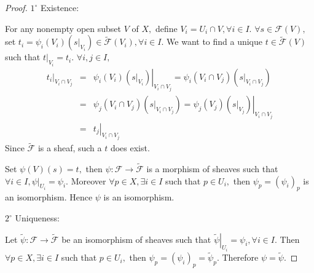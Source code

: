 \begin{proof}
$\mathit{1^{\circ}}$ Existence:

For any nonempty open subset $V$ of $X,$ define $V_i=U_i\cap V,
\forall i\in I.$ $\forall s\in\mathscr{F}(V),$ set
$t_i=\psi_i(V_i)(\left.s\right|_{V_i})\in\widetilde{\mathscr{F}}(V_i),
\forall i\in I.$ We want to find a unique
$t\in\widetilde{\mathscr{F}}(V)$ such that
$\left.t\right|_{V_i}=t_i.$ $\forall i,j\in I,$
\begin{eqnarray*}
\left.t_i\right|_{V_i\cap V_j} & = &
\left.\psi_i(V_i)(\left.s\right|_{V_i})\right|_{V_i\cap
V_j}=\psi_i(V_i\cap V_j)(\left.s\right|_{V_i\cap V_j})       \\
& = & \psi_j(V_i\cap V_j)(\left.s\right|_{V_i\cap
V_j})=\left.\psi_j(V_j)(\left.s\right|_{V_j})\right|_{V_i\cap V_j} \\
& = & \left.t_j\right|_{V_i\cap V_j}
\end{eqnarray*}
Since $\widetilde{\mathscr{F}}$ is a sheaf, such a $t$ does exist.

Set $\psi(V)(s)=t,$ then $\psi: \mathscr{F}\rightarrow
\widetilde{\mathscr{F}}$ is a morphism of sheaves such that $\forall
i\in I, \left.\psi\right|_{U_i}=\psi_i.$ Moreover $\forall p\in X,
\exists i\in I$ such that $p\in U_i,$ then $\psi_p=(\psi_i)_p$ is an
isomorphism. Hence $\psi$ is an isomorphism.

$\mathit{2^{\circ}}$ Uniqueness:

Let $\widetilde{\psi}: \mathscr{F}\rightarrow
\widetilde{\mathscr{F}}$ be an isomorphism of sheaves such that
$\left.\widetilde{\psi}\right|_{U_i}=\psi_i, \forall i\in I.$ Then
$\forall p\in X, \exists i\in I$ such that $p\in U_i,$ then
$\psi_p=(\psi_i)_p=\widetilde{\psi}_p.$ Therefore
$\psi=\widetilde{\psi}.$
\end{proof}
